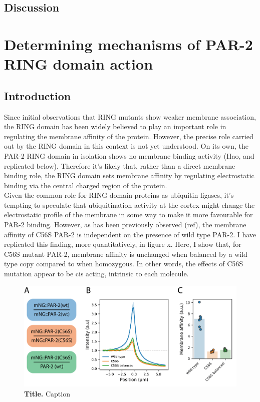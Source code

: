 \documentclass[12pt]{"article"}
\newcommand{\mycaption}[2]{\caption[#1]{\textbf{#1.} #2}}
\begin{document}
\clearpage
\subsection{Discussion}

\clearpage
\section{Determining mechanisms of PAR-2 RING domain action}

\subsection{Introduction}


Since initial observations that RING mutants show weaker membrane association, the RING domain has been widely believed to play an important role in regulating the membrane affinity of the protein. However, the precise role carried out by the RING domain in this context is not yet understood. On its own, the PAR-2 RING domain in isolation shows no membrane binding activity (Hao, and replicated below). Therefore it's likely that, rather than a direct membrane binding role, the RING domain sets membrane affinity by regulating electrostatic binding via the central charged region of the protein.\\

Given the common role for RING domain proteins as ubiquitin ligases, it's tempting to speculate that ubiquitination activity at the cortex might change the electrostatic profile of the membrane in some way to make it more favourable for PAR-2 binding. However, as has been previously observed (ref), the membrane affinity of C56S PAR-2 is independent on the presence of wild type PAR-2. I have replicated this finding, more quantitatively, in figure x. Here, I show that, for C56S mutant PAR-2, membrane affinity is unchanged when balanced by a wild type copy compared to when homozygous. In other words, the effects of C56S mutation appear to be cis acting, intrinsic to each molecule.

\begin{figure}[!h]
\includegraphics[scale=1]{c56s_cis}
\setlength{\abovecaptionskip}{20pt}
\centering
\mycaption{Title}{Caption}
\label{fig:c56s_cis}
\end{figure}
\end{document}
